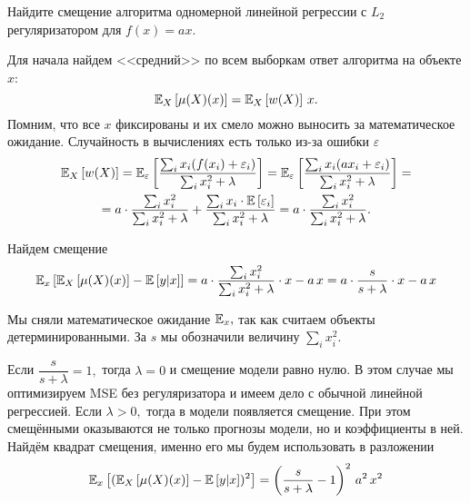 \documentclass[12pt,fleqn]{article}
\begin{document}
\begin{vkProblem}
Найдите смещение алгоритма одномерной линейной регрессии с $L_2$ регуляризатором для $f(x) = ax$.
\end{vkProblem}
\begin{esSolution}
    Для начала найдем <<средний>> по всем выборкам ответ алгоритма на объекте $x$:
    $$
    \mathbb{E}_{X}\left[\mu(X)(x)\right] = \mathbb{E}_{X}\left[w(X)\right] \, x.
    $$
    Помним, что все $x$ фиксированы и их смело можно выносить за математическое ожидание. Случайность в вычислениях есть только из-за ошибки $\varepsilon$
    \begin{multline*}
        \EE_{X}\left[w(X)\right]
        =
        \EE_{\varepsilon} \left[\dfrac{\sum_i x_i (f(x_i) + \varepsilon_i)}{\sum_i x_i^2 + \lambda} \right]
        =
        \EE_{\varepsilon} \left[\dfrac{\sum_i x_i (ax_i + \varepsilon_i)}{\sum_i x_i^2 + \lambda} \right]
        = \\ =
        a \cdot \dfrac{\sum_i x_i^2}{\sum_i x_i^2 + \lambda} + \dfrac{\sum_i x_i \cdot \EE\left[\varepsilon_i\right]}{\sum_i x_i^2 + \lambda}
        =
        a \cdot \dfrac{\sum_i x_i^2}{\sum_i x_i^2 + \lambda}.
    \end{multline*}

    Найдем смещение
    $$
    \EE_{x} \left[\EE_{X}\left[\mu(X)(x)\right] - \EE\left[y|x\right]  \right]
    =
    a \cdot \dfrac{\sum_i x_i^2}{\sum_i x_i^2 + \lambda} \cdot x -  a\, x
    =
    a \cdot \dfrac{s}{s + \lambda} \cdot x -  a\, x
    $$

    Мы сняли математическое ожидание $\mathbb{E}_{x},$ так как считаем объекты детерминированными.
    За $s$ мы обозначили величину $\sum_i x_i^2$.
    
    Если $\dfrac{s}{s + \lambda} = 1,$ тогда $\lambda = 0$ и смещение модели равно нулю.
    В этом случае мы оптимизируем MSE без регуляризатора и имеем дело с обычной линейной регрессией.
    Если $\lambda > 0,$ тогда в модели появляется смещение.
    При этом смещёнными оказываются не только прогнозы модели, но и коэффициенты в ней.
    Найдём квадрат смещения, именно его мы будем использовать в разложении
    $$
    \mathbb{E}_{x} \left[(\mathbb{E}_{X}\left[\mu(X)(x)\right] - \mathbb{E}\left[y|x\right])^2 \right] = \left(\dfrac{s}{s + \lambda} - 1\right)^2\, a^2\, x^2
    $$
\end{esSolution}
\end{document}
